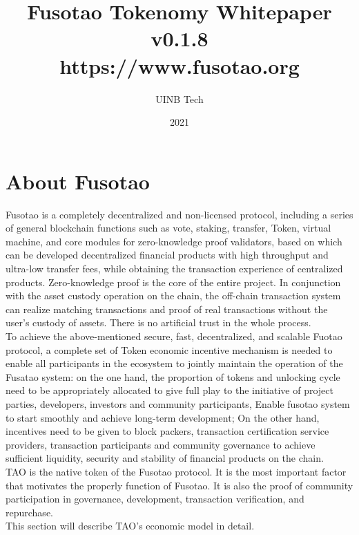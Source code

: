 \documentclass[a4paper,12pt]{article}
\author{UINB Tech}
\date{2021}
\title{Fusotao Tokenomy Whitepaper\\\medskip
  \large v0.1.8\\\medskip
  \large https://www.fusotao.org}
\begin{document}
\maketitle
\clearpage

\section{About Fusotao}
\label{sec:1}
Fusotao is a completely decentralized and non-licensed protocol, including a series of general blockchain functions such as vote, staking, transfer, Token, virtual machine, and core modules for zero-knowledge proof validators, based on which can be developed decentralized financial products with high throughput and ultra-low transfer fees, while obtaining the transaction experience of centralized products. Zero-knowledge proof is the core of the entire project. In conjunction with the asset custody operation on the chain, the off-chain transaction system can realize matching transactions and proof of real transactions without the user's custody of assets. There is no artificial trust in the whole process.\\
To achieve the above-mentioned secure, fast, decentralized, and scalable Fuotao protocol, a complete set of Token economic incentive mechanism is needed to enable all participants in the ecosystem to jointly maintain the operation of the Fusatao system: on the one hand, the proportion of tokens and unlocking cycle need to be appropriately allocated to give full play to the initiative of project parties, developers, investors and community participants, Enable fusotao system to start smoothly and achieve long-term development; On the other hand, incentives need to be given to block packers, transaction certification service providers, transaction participants and community governance to achieve sufficient liquidity, security and stability of financial products on the chain.\\
TAO is the native token of the Fusotao protocol. It is the most important factor that motivates the properly function of Fusotao. It is also the proof of community participation in governance, development, transaction verification, and repurchase. \\
This section will describe TAO's economic model in detail.\\
\end{document}
